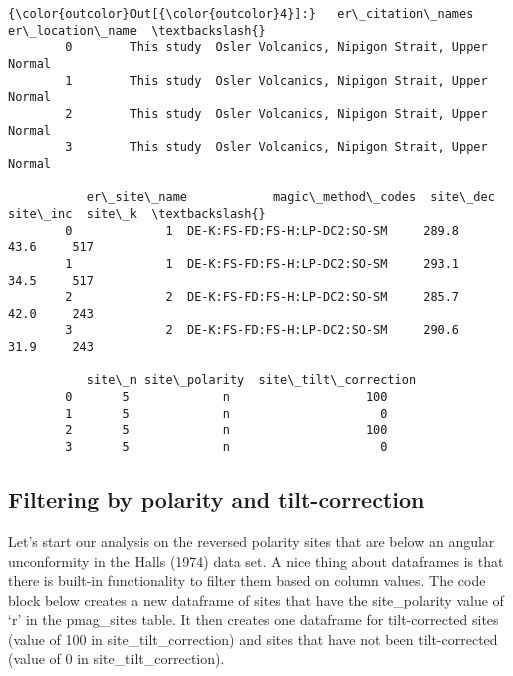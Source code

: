 \documentclass{article}
\begin{document}
            \begin{Verbatim}[commandchars=\\\{\}]
{\color{outcolor}Out[{\color{outcolor}4}]:}   er\_citation\_names                               er\_location\_name  \textbackslash{}
        0        This study  Osler Volcanics, Nipigon Strait, Upper Normal   
        1        This study  Osler Volcanics, Nipigon Strait, Upper Normal   
        2        This study  Osler Volcanics, Nipigon Strait, Upper Normal   
        3        This study  Osler Volcanics, Nipigon Strait, Upper Normal   
        
           er\_site\_name            magic\_method\_codes  site\_dec  site\_inc  site\_k  \textbackslash{}
        0             1  DE-K:FS-FD:FS-H:LP-DC2:SO-SM     289.8      43.6     517   
        1             1  DE-K:FS-FD:FS-H:LP-DC2:SO-SM     293.1      34.5     517   
        2             2  DE-K:FS-FD:FS-H:LP-DC2:SO-SM     285.7      42.0     243   
        3             2  DE-K:FS-FD:FS-H:LP-DC2:SO-SM     290.6      31.9     243   
        
           site\_n site\_polarity  site\_tilt\_correction  
        0       5             n                   100  
        1       5             n                     0  
        2       5             n                   100  
        3       5             n                     0  
\end{Verbatim}
        
    \subsection{Filtering by polarity and
tilt-correction}\label{filtering-by-polarity-and-tilt-correction}

Let's start our analysis on the reversed polarity sites that are below
an angular unconformity in the Halls (1974) data set. A nice thing about
dataframes is that there is built-in functionality to filter them based
on column values. The code block below creates a new dataframe of sites
that have the site\_polarity value of `r' in the pmag\_sites table. It
then creates one dataframe for tilt-corrected sites (value of 100 in
site\_tilt\_correction) and sites that have not been tilt-corrected
(value of 0 in site\_tilt\_correction).
\end{document}
